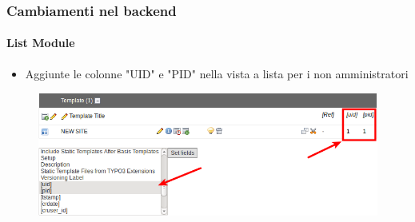 
\begin{frame}[fragile]
	\frametitle{Cambiamenti nel backend}
	\framesubtitle{List Module}

	\begin{itemize}
		\item Aggiunte le colonne "UID" e "PID" nella vista a lista per i non amministratori
	\end{itemize}

	\begin{figure}
		\includegraphics[width=0.95\linewidth]{Images/BackendChanges/AdditionalColumnsInListModule.png}
	\end{figure}

\end{frame}



